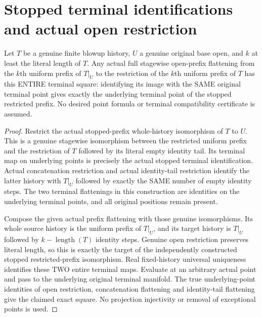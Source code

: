 \section{Stopped terminal identifications and actual open restriction}

\begin{theorem}
\label{hir:sharp-actual-curve-stopped-prefix-open-terminal-square}
\leanok
Let $T$ be a genuine finite blowup history, $U$ a genuine original base
open, and $k$ at least the literal length of $T$. Any actual full
stagewise open-prefix flattening from the $k$th uniform prefix of
$T|_U$ to the restriction of the $k$th uniform prefix of $T$ has this
ENTIRE terminal square: identifying its image with the SAME original
terminal point gives exactly the underlying terminal point of the
stopped restricted prefix. No desired point formula or terminal
compatibility certificate is assumed.
\end{theorem}
\begin{proof}
Restrict the actual stopped-prefix whole-history isomorphism of $T$ to
$U$. This is a genuine stagewise isomorphism between the restricted
uniform prefix and the restriction of $T$ followed by its literal empty
identity tail. Its terminal map on underlying points is precisely the
actual stopped terminal identification. Actual concatenation restriction
and actual identity-tail restriction identify the latter history with
$T|_U$ followed by exactly the SAME number of empty identity steps. The
two terminal flattenings in this construction are identities on the
underlying terminal points, and all original positions remain present.

Compose the given actual prefix flattening with those genuine
isomorphisms. Its whole source history is the uniform prefix of $T|_U$,
and its target history is $T|_U$ followed by $k-\operatorname{length}(T)$
identity steps. Genuine open restriction preserves literal length, so
this is exactly the target of the independently constructed stopped
restricted-prefix isomorphism. Real fixed-history universal uniqueness
identifies these TWO entire terminal maps. Evaluate at an arbitrary
actual point and pass to the underlying original terminal manifold.
The true underlying-point identities of open restriction, concatenation
flattening and identity-tail flattening give the claimed exact square.
No projection injectivity or removal of exceptional points is used.
\end{proof}

